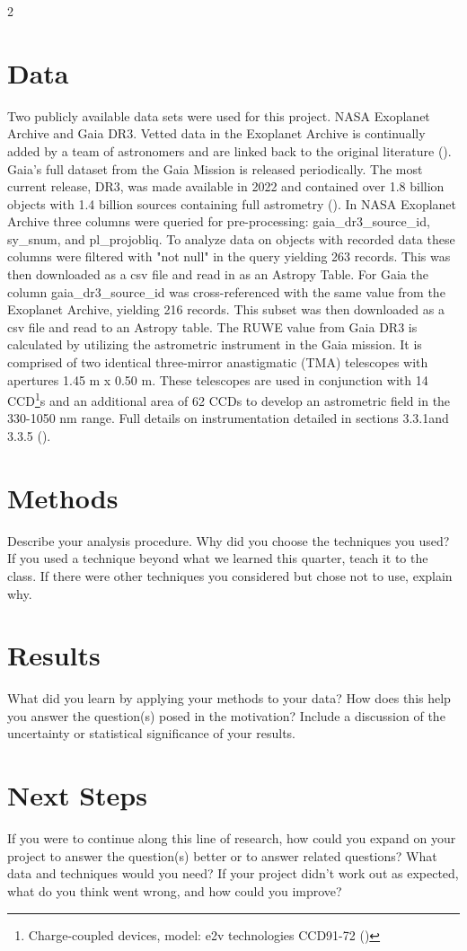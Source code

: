 \documentclass[fleqn]{article}
\begin{document}
\begin{multicols}{2}
		\section*{Data}
		Two publicly available data sets were used for this project. NASA Exoplanet Archive and Gaia DR3. Vetted data in the Exoplanet Archive is continually added by a team of astronomers and are linked back to the original literature (\cite{ExoArchive}). Gaia’s full dataset from the Gaia Mission is released periodically. The most current release, DR3, was made available in 2022 and contained over 1.8 billion objects with 1.4 billion sources containing full astrometry (\cite{GaiaDR3}).
		In NASA Exoplanet Archive three columns were queried for pre-processing: gaia\_dr3\_source\_id, sy\_snum, and pl\_projobliq. To analyze data on objects with recorded data these columns were filtered with "not null" in the query yielding 263 records. This was then downloaded as a csv file and read in as an Astropy Table. For Gaia the column gaia\_dr3\_source\_id was cross-referenced with the same value from the Exoplanet Archive, yielding 216 records. This subset was then downloaded as a csv file and read to an Astropy table.
		The RUWE value from Gaia DR3 is calculated by utilizing the astrometric instrument in the Gaia mission. It is comprised of two identical three-mirror anastigmatic (TMA) telescopes with apertures 1.45 m x 0.50 m. These telescopes are used in conjunction with 14 CCD\footnote{Charge-coupled devices, model: e2v technologies CCD91-72 (\cite{Bruijne})}s and an additional area of 62 CCDs to develop an astrometric field in the 330-1050 nm range. Full details on instrumentation detailed in sections 3.3.1and 3.3.5 (\cite{GaiaDr3-2016}).
\		
		\section*{Methods}
		Describe your analysis procedure. Why did you choose the techniques you used? If you used a technique beyond what we learned this quarter, teach it to the class. If there were other techniques you considered but chose not to use, explain why. 
		
		\section*{Results}
		What did you learn by applying your methods to your data? How does this help you answer the question(s) posed in the motivation? Include a discussion of the uncertainty or statistical significance of your results.
		
		\section*{Next Steps}
		If you were to continue along this line of research, how could you expand on your project to answer the question(s) better or to answer related questions? What data and techniques would you need? If your project didn't work out as expected, what do you think went wrong, and how could you improve?
	\end{multicols}
	
	\pagebreak
	
	\printbibliography
\end{document}
